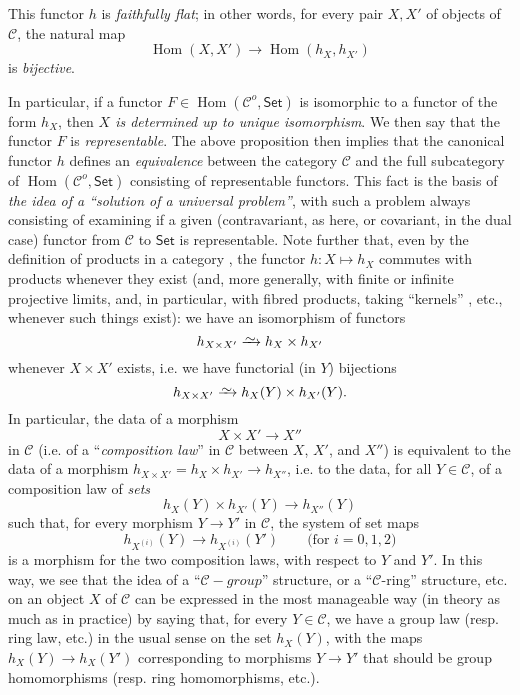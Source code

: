 \documentclass{article}
\theoremstyle{plain}
\newenvironment{proposition}[1]
  {\renewcommand\theinnercustomproposition{#1}\innercustomproposition}
  {\endinnercustomproposition}
\theoremstyle{definition}
\newcommand{\cat}[1]{{\mathcal{#1}}}
\newcommand{\simto}{\xrightarrow{\raisebox{-0.7ex}[0ex][0ex]{$\sim$}}}
\newcommand{\Set}{\mathsf{Set}}
\DeclareMathOperator{\Hom}{Hom}
\newcommand{\oldpage}[1]{\marginpar{\footnotesize$\Big\vert$ \textit{p.~#1}}}
\begin{document}
\begin{proposition}{1}
\label{A.1-proposition1}
  This functor $h$ is \emph{faithfully flat};
  in other words, for every pair $X,X'$ of objects of $\cat{C}$, the natural map
  \[
    \Hom(X,X') \to \Hom(h_X,h_{X'})
  \]
  is \emph{bijective}.
\end{proposition}

In particular, if a functor $F\in\Hom(\cat{C}^o,\Set)$ is isomorphic to a functor of the form $h_X$, then \emph{$X$ is determined up to unique isomorphism}.
We then say that the functor $F$ is \emph{representable}.
The above proposition then implies that the canonical functor $h$ defines an \emph{equivalence} between the category $\cat{C}$ and the full subcategory of $\Hom(\cat{C}^o,\Set)$ consisting of representable functors.
This fact is the basis of \emph{the idea of a ``solution of a universal problem''}, with such a problem always consisting of examining if a given (contravariant, as here, or covariant, in the dual case) functor from $\cat{C}$ to $\Set$ is representable.
\oldpage{195-02}
Note further that, even by the definition of products in a category \cite{1}, the functor $h\colon X\mapsto h_X$ commutes with products whenever they exist (and, more generally, with finite or infinite projective limits, and, in particular, with fibred products, taking ``kernels'' \cite{2}, etc., whenever such things exist): we have an isomorphism of functors
\[
  h_{X\times X'} \simto h_X\times h_{X'}
\]
whenever $X\times X'$ exists, i.e. we have functorial (in $Y$) bijections
\[
  h_{X\times X'} \simto h_X(Y)\times h_{X'}(Y).
\]
In particular, the data of a morphism
\[
  X\times X' \to X''
\]
in $\cat{C}$ (i.e. of a ``\emph{composition law}'' in $\cat{C}$ between $X$, $X'$, and $X''$) is equivalent to the data of a morphism $h_{X\times X'}=h_X\times h_{X'}\to h_{X''}$, i.e. to the data, for all $Y\in\cat{C}$, of a composition law of \emph{sets}
\[
  h_X(Y)\times h_{X'}(Y) \to h_{X''}(Y)
\]
such that, for every morphism $Y\to Y'$ in $\cat{C}$, the system of set maps
\[
  h_{X^{(i)}}(Y) \to h_{X^{(i)}}(Y')
  \qquad\mbox{(for $i=0,1,2$)}
\]
is a morphism for the two composition laws, with respect to $Y$ and $Y'$.
In this way, we see that the idea of a ``$\cat{C}-group$'' structure, or a ``$\cat{C}$-ring'' structure, etc. on an object $X$ of $\cat{C}$ can be expressed in the most manageable way (in theory as much as in practice) by saying that, for every $Y\in\cat{C}$, we have a group law (resp. ring law, etc.) in the usual sense on the set $h_X(Y)$, with the maps $h_X(Y)\to h_X(Y')$ corresponding to morphisms $Y\to Y'$ that should be group homomorphisms (resp. ring homomorphisms, etc.).
\end{document}
